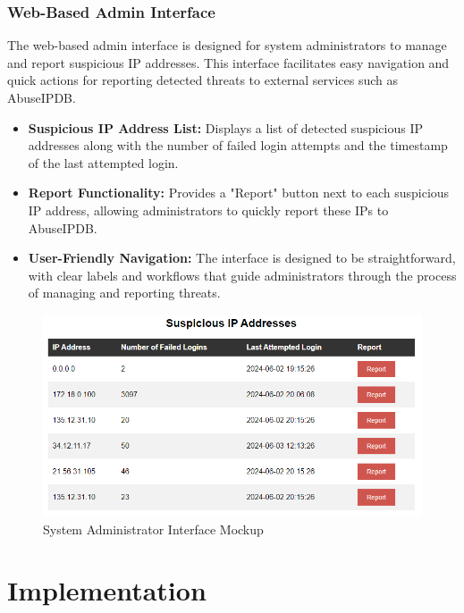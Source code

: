 \documentclass{article}
\begin{document}
    \subsubsection{Web-Based Admin Interface}\label{subsubsec:web-based-admin-interface}

    The web-based admin interface is designed for system administrators to manage and report suspicious IP addresses.
    This interface facilitates easy navigation and quick actions for reporting detected threats to external services such as AbuseIPDB\@.

    \begin{itemize}
        \item \textbf{Suspicious IP Address List:} Displays a list of detected suspicious IP addresses along with the number of failed login attempts and the timestamp of the last attempted login.
        \item \textbf{Report Functionality:} Provides a "Report" button next to each suspicious IP address, allowing administrators to quickly report these IPs to AbuseIPDB\@.
        \item \textbf{User-Friendly Navigation:} The interface is designed to be straightforward, with clear labels and workflows that guide administrators through the process of managing and reporting threats.
    \end{itemize}

    \begin{figure}[H]
        \centering
        \includegraphics[width=\textwidth]{./images/mockup.png}
        \caption{System Administrator Interface Mockup}
        \label{fig:sysadmin-interface}
    \end{figure}

    \newpage


    \section{Implementation}\label{sec:implementation}
\end{document}
